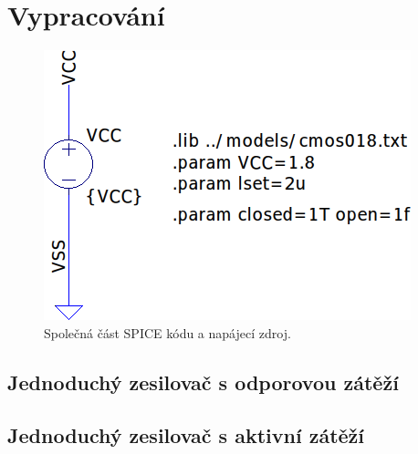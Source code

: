 \documentclass{protokol}
\begin{document}
	\maketitle

\section{Vypracování}
\begin{figure}[h!]
  \centering
  \includegraphics[scale=0.5]{spice0.png}
  \caption{Společná část SPICE kódu a napájecí zdroj.}
  \label{fig:spice0-png}
\end{figure}
 
\subsection{Jednoduchý zesilovač s odporovou zátěží}



  \clearpage
\subsection{Jednoduchý zesilovač s aktivní zátěží}


\clearpage
\end{document}
